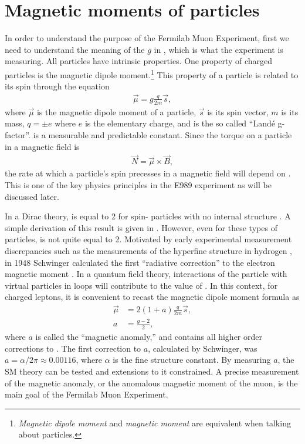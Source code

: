 \section{Magnetic moments of particles}
\label{sec:MDMs}

In order to understand the purpose of the Fermilab Muon \gmtwo Experiment, first we need to understand the meaning of the $g$ in \gmtwo, which is what the experiment is measuring. All particles have intrinsic properties. One property of charged particles is the magnetic dipole moment.\footnote{\textit{Magnetic dipole moment} and \textit{magnetic moment} are equivalent when talking about particles.} This property of a particle is related to its spin through the equation
		\begin{align}
            \vec{\mu} = g \frac{q}{2m} \vec{s},
        \label{eq:magneticmoment}
		\end{align}
where $\vec{\mu}$ is the magnetic dipole moment of a particle, $\vec{s}$ is its spin vector, $m$ is its mass, $q = \pm e$ where $e$ is the elementary charge, and \g is the so called ``Land\'{e} g-factor''. \g is a measurable and predictable constant. Since the torque on a particle in a magnetic field is 
		\begin{align}
            \vec{N} = \vec{\mu} \times \vec{B},
        \label{eq:torque}
		\end{align}
the rate at which a particle's spin precesses in a magnetic field will depend on \g. This is one of the key physics principles in the E989 experiment as will be discussed later.

In a Dirac theory, \g is equal to 2 for spin-\textonehalf\xspace particles with no internal structure \cite{Dirac}. A simple derivation of this result is given in . However, even for these types of particles, \g is not quite equal to 2. Motivated by early experimental measurement discrepancies such as the measurements of the hyperfine structure in hydrogen \cite{EarlyHyperfine1}, in 1948 Schwinger calculated the first ``radiative correction'' to the electron magnetic moment \cite{Schwinger}. In a quantum field theory, interactions of the particle with virtual particles in loops will contribute to the value of \g. In this context, for charged leptons, it is convenient to recast the magnetic dipole moment formula as 
		\begin{equation}
		\begin{aligned}
            \vec{\mu} &= 2(1+a) \frac{q}{2m} \vec{s}, \\
            a &= \frac{g-2}{2},
        \label{eq:anamoly}
		\end{aligned}
		\end{equation}
where $a$ is called the ``magnetic anomaly,'' and contains all higher order corrections to \g. The first correction to $a$, calculated by Schwinger, was $a = \alpha/2\pi \approx 0.00116$, where $\alpha$ is the fine structure constant. By measuring $a$, the SM theory can be tested and extensions to it constrained. A precise measurement of the magnetic anomaly, or the anomalous magnetic moment of the muon, is the main goal of the Fermilab Muon \gmtwo Experiment.


